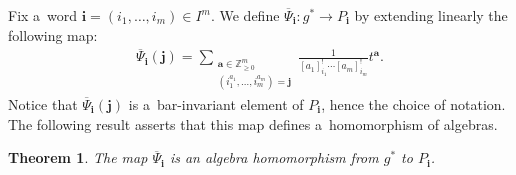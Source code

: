 \documentclass[pdftex]{sigma}
\numberwithin{equation}{section}
\newtheorem{Theorem}{Theorem}[section]
\begin{document}
Fix a~word $\mathbf{i}=(i_1,\ldots,i_m)\in I^m$.
We def\/ine $\overline\Psi_\mathbf{i}: g^*\to P_\mathbf{i}$ by extending linearly the following map:
\begin{gather*}
\overline\Psi_\mathbf{i}(\mathbf{j})=\sum\limits_{\substack{\mathbf{a}\in\mathbb{Z}_{\ge0}^m
\\
(i_1^{a_1},\ldots,i_m^{a_m})=\mathbf{j}}}\frac{1}{[a_1]^!_{i_1}\cdots[a_m]^!_{i_m}} t^\mathbf{a}.
\end{gather*}
Notice that $\overline\Psi_\mathbf{i}(\mathbf{j})$ is a~bar-invariant element of $P_\mathbf{i}$, hence the choice of
notation.
The following result asserts that this map def\/ines a~homomorphism of algebras.
\begin{Theorem}
The map $\overline\Psi_\mathbf{i}$ is an algebra homomorphism from $g^*$ to $P_\mathbf{i}$.
\end{Theorem}
\end{document}
